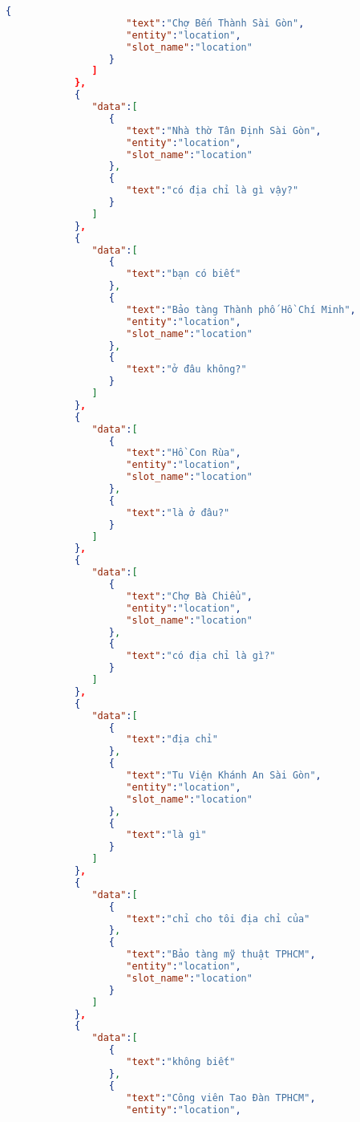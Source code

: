 \begin{lstlisting}[language=json,firstnumber=1]
                  {
                     "text":"Chợ Bến Thành Sài Gòn",
                     "entity":"location",
                     "slot_name":"location"
                  }
               ]
            },
            {
               "data":[
                  {
                     "text":"Nhà thờ Tân Định Sài Gòn",
                     "entity":"location",
                     "slot_name":"location"
                  },
                  {
                     "text":"có địa chỉ là gì vậy?"
                  }
               ]
            },
            {
               "data":[
                  {
                     "text":"bạn có biết"
                  },
                  {
                     "text":"Bảo tàng Thành phố Hồ Chí Minh",
                     "entity":"location",
                     "slot_name":"location"
                  },
                  {
                     "text":"ở đâu không?"
                  }
               ]
            },
            {
               "data":[
                  {
                     "text":"Hồ Con Rùa",
                     "entity":"location",
                     "slot_name":"location"
                  },
                  {
                     "text":"là ở đâu?"
                  }
               ]
            },
            {
               "data":[
                  {
                     "text":"Chợ Bà Chiểu",
                     "entity":"location",
                     "slot_name":"location"
                  },
                  {
                     "text":"có địa chỉ là gì?"
                  }
               ]
            },
            {
               "data":[
                  {
                     "text":"địa chỉ"
                  },
                  {
                     "text":"Tu Viện Khánh An Sài Gòn",
                     "entity":"location",
                     "slot_name":"location"
                  },
                  {
                     "text":"là gì"
                  }
               ]
            },
            {
               "data":[
                  {
                     "text":"chỉ cho tôi địa chỉ của"
                  },
                  {
                     "text":"Bảo tàng mỹ thuật TPHCM",
                     "entity":"location",
                     "slot_name":"location"
                  }
               ]
            },
            {
               "data":[
                  {
                     "text":"không biết"
                  },
                  {
                     "text":"Công viên Tao Đàn TPHCM",
                     "entity":"location",

\end{lstlisting}
